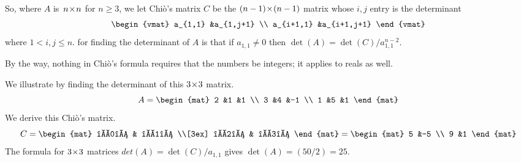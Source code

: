 So, where $A$ is~$n \! \times \! n$ for $n\geq 3$, we let Chi\`o's matrix $C$ be the
$(n-1) \! \times \! (n-1)$ matrix whose $i,j$ entry is the determinant
\begin{equation*}
  \begin{vmat}
    a_{1,1}  &a_{1,j+1} \\
    a_{i+1,1}    &a_{i+1,j+1}
  \end{vmat}
\end{equation*}
where $1<i,j\leq n$.
for finding the determinant of $A$ is that
if $a_{1,1}\neq 0$ then
$\det(A)=\det(C)/a_{1,1}^{n-2}$.

By the way,
nothing in Chi\`o's formula requires that the numbers be integers; it applies
to reals as well. 

We illustrate by finding the determinant of this $3 \! \times \! 3$ matrix.
\begin{equation*} 
  A=
  \begin{mat}
    2 &1 &1 \\
    3 &4 &-1 \\
    1 &5 &1 
  \end{mat}
\end{equation*}
We derive this Chi\`o's matrix.
\begin{equation*}
  C=
  \begin{mat}
    \begin{vmat}
      2 &1 \\
      3 &4
    \end{vmat}
   &
   \begin{vmat}
     2 &1 \\
     3 &-1
   \end{vmat}        \\[3ex]      
   \begin{vmat}
     2 &1 \\
     1 &5
   \end{vmat}
   &
   \begin{vmat}
     2 &1 \\
     1 &1
   \end{vmat}
  \end{mat}
  =
  \begin{mat}
    5  &-5  \\
    9  &1
  \end{mat}
\end{equation*}
The formula for $3 \! \times \! 3$ matrices
$det(A)=\det(C)/a_{1,1}$ gives $\det(A)=(50/2)=25$.

